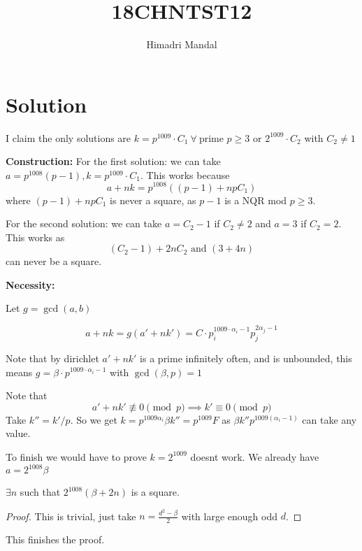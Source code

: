 \documentclass[11pt]{scrartcl}
\title{18CHNTST12}
\author{Himadri Mandal}
\begin{document}
\maketitle

\section{Solution}
\begin{soln}
I claim the only solutions are $k = p^{1009} \cdot C_1 \ \forall \ \text{
prime }p \geq 3 \text{ or } 2^{1009} \cdot C_2$ with $C_2 \neq 1$

\bigskip
\raggedright
{\color{purple}\textbf{Construction:}}
For the first solution:
we can take $a = p^{1008} (p-1), k = p^{1009}\cdot C_1$. This works 
because 
$$a + nk = p^{1008}((p-1)+npC_1)$$
where $(p-1)+npC_1$ is never a square, as $p-1$ is a NQR mod $p\geq 3$.

For the second solution: we can take $a = C_2 - 1$ if $C_2 \neq 2$ and $a = 3$ if $C_2 = 2$. This works as 
  $$(C_2 - 1) + 2nC_2 \text{ and } (3 + 4n)$$ can never be a square.

\bigskip
{\color{purple}\textbf{Necessity:}}

Let $g = \gcd(a,b)$

$$a+nk = g(a' + nk') = C \cdot p_i^{1009 \cdot \alpha_i -1} p_j^{2\alpha_j-1}$$

Note that by dirichlet $a' + nk'$ is a prime infinitely often, and is unbounded, this 
means $g = \beta \cdot p^{1009 \cdot \alpha_i - 1}$ with $\gcd(\beta,p) = 1$

Note that
$$a' + nk' \not\equiv 0 \pmod{p} \implies k' \equiv 0 \pmod{p}$$
Take $k'' = k'/p$. So we get $k = p^{1009\alpha_i} \beta k'' = p^{1009} F$ as $\beta k'' p^{1009(\alpha_i-1)}$ can take any value.

\bigskip
To finish we would have to prove $k = 2^{1009}$ doesnt work. We already have $a = 2^{1008} \beta$
\begin{claim}
	$\exists n$ such that $2^{1008}(\beta + 2n)$ is a square.
\end{claim}
\begin{proof}
This is trivial, just take $n = \frac{d^2-\beta}{2}$ with large enough odd $d$.
\end{proof}

This finishes the proof.
\end{soln}
\end{document}
